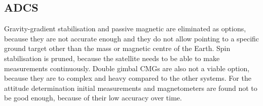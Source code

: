 \subsection{\ac{ADCS}}
\label{mtrTOprune_ADCS}
Gravity-gradient stabilisation and passive magnetic are eliminated as options, because they are not accurate enough and they do not allow pointing to a specific ground target other than the mass or magnetic centre of the Earth. Spin stabilisation is pruned, because the satellite needs to be able to make measurements continuously. Double gimbal \acp{CMG} are also not a viable option, because they are to complex and heavy compared to the other systems.
For the attitude determination initial measurements and magnetometers are found not to be good enough, because of their low accuracy over time.